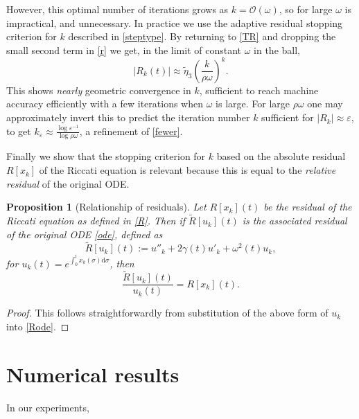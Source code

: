 \documentclass[10pt]{article}
\newcommand{\be}{\begin{equation}}
\newcommand{\ee}{\end{equation}}
\newcommand{\bigO}{{\mathcal O}}
\newtheorem{pro}[thm]{Proposition}
\newcommand{\om}{\omega}
\newcommand{\te}{\tilde\eta}
\begin{document}
However, this optimal number of iterations grows as $k = \bigO(\om)$,
so for large $\om$ is impractical, and unnecessary.
In practice we use the adaptive residual stopping criterion for $k$
described in \cref{steptype}.
By returning to \cref{TR} and dropping the small second term
in \cref{r} we get, in the limit of constant $\om$ in the ball,
$$
|R_k(t)|  \approx  \te_3 \left( \frac{k}{\rho\om}\right)^k.
$$
This shows \textit{nearly} geometric convergence in $k$,
sufficient to reach machine accuracy efficiently with a few iterations
when $\om$ is large.
For large $\rho\om$ one may approximately invert this to predict the iteration number $k$ sufficient for $|R_k| \approx \varepsilon$, to get
$ k_\varepsilon \approx \frac{\log \varepsilon^{-1}}{\log \rho\om}$,
a refinement of \cref{fewer}.

Finally we show that the stopping criterion for $k$ based on the absolute
residual $R[x_k]$ of the Riccati equation is relevant because this is equal
to the \emph{relative residual} of the original ODE.
\begin{pro}[Relationship of residuals]\label{residualu}
    Let $R[x_k](t)$ be the residual of the Riccati equation as defined in
    \cref{R}.
    Then if
    $\tilde{R}[u_k](t)$ is the associated residual of the original ODE
    \cref{ode}, defined as
    \be\label{Rode}
    \tilde{R}[u_k](t) := u''_k + 2\gamma(t)u'_k + \omega^2(t) u_k,
    \ee
    for $u_k(t) = e^{\int_0^t x_k(\sigma)\mathrm{d}\sigma}$, then
    \be
    \frac{\tilde{R}[u_k](t)}{u_k(t)} = R[x_k](t).
    \ee
\end{pro}
\begin{proof}
    This follows straightforwardly from substitution of the above form of $u_k$ into \cref{Rode}.
\end{proof}



\section{Numerical results \label{numresults}}

In our experiments, 
\end{document}
